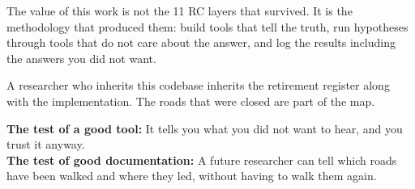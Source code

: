 \documentclass[11pt]{article}
\begin{document}
The value of this work is not the 11 RC layers that survived. It is the methodology that produced them: build tools that tell the truth, run hypotheses through tools that do not care about the answer, and log the results including the answers you did not want.

A researcher who inherits this codebase inherits the retirement register along with the implementation. The roads that were closed are part of the map.

\begin{graybox}
\textbf{The test of a good tool:} It tells you what you did not want to hear, and you trust it anyway.\\[0.5em]
\textbf{The test of good documentation:} A future researcher can tell which roads have been walked and where they led, without having to walk them again.
\end{graybox}
\end{document}
